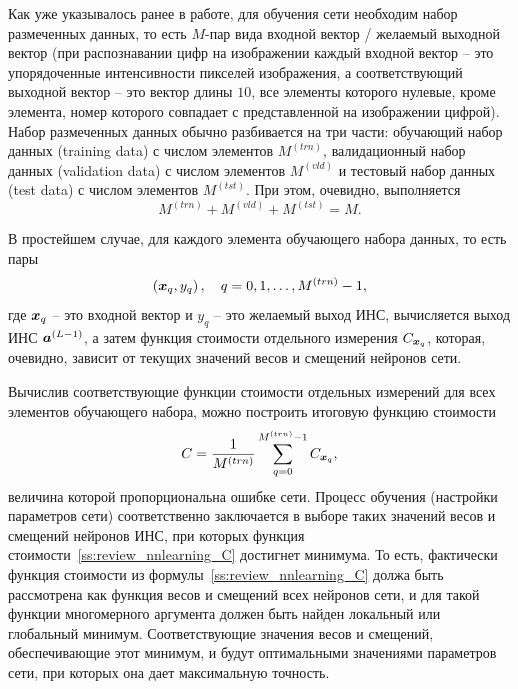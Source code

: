 \documentclass[a4paper,12pt,russian]{article} %
\begin{document}
Как уже указывалось ранее в работе, для обучения сети необходим набор размеченных данных, то есть $M$-пар вида входной вектор / желаемый выходной вектор (при распознавании цифр на изображении каждый входной вектор -- это упорядоченные интенсивности пикселей изображения, а соответствующий выходной вектор -- это вектор длины $10$, все элементы которого нулевые, кроме элемента, номер которого совпадает с представленной на изображении цифрой).
Набор размеченных данных обычно разбивается на три части:  обучающий набор данных (training data) с числом элементов $M^{(trn)}$, валидационный набор данных (validation data) с числом элементов $M^{(vld)}$ и тестовый набор данных (test data) с числом элементов $M^{(tst)}$.
При этом, очевидно, выполняется
$$
	M^{(trn)} + M^{(vld)} + M^{(tst)} = M.
$$

В простейшем случае, для каждого элемента обучающего набора данных, то есть пары 
$$
	\left( \bm{x}_q, y_q \right), \quad q=0, 1, \ldots, M^{(trn)}-1,
$$
где $\bm{x}_q$ -- это входной вектор и $y_q$ -- это желаемый выход ИНС, вычисляется выход ИНС $\bm{a}^{(L-1)}$, а затем функция стоимости отдельного измерения $C_{\bm{x}_q}$, которая, очевидно, зависит от текущих значений весов и смещений нейронов сети.

Вычислив соответствующие функции стоимости отдельных измерений для всех элементов обучающего набора, можно построить итоговую функцию стоимости
\begin{equation} \label{ss:review_nnlearning_C}
	C = \frac{1}{M^{(trn)}} \sum_{q=0}^{M^{(trn)}-1} C_{\bm{x}_q},
\end{equation}
величина которой пропорциональна ошибке сети.
Процесс обучения (настройки параметров сети) соответственно заключается в выборе таких значений весов и смещений нейронов ИНС, при которых функция стоимости~\eqref{ss:review_nnlearning_C} достигнет минимума.
То есть, фактически функция стоимости из формулы~\eqref{ss:review_nnlearning_C} должа быть рассмотрена как функция весов и смещений всех нейронов сети, и для такой функции многомерного аргумента должен быть найден локальный или глобальный минимум.
Соответствующие значения весов и смещений, обеспечивающие этот минимум, и будут оптимальными значениями параметров сети, при которых она дает максимальную точность.
\end{document}
